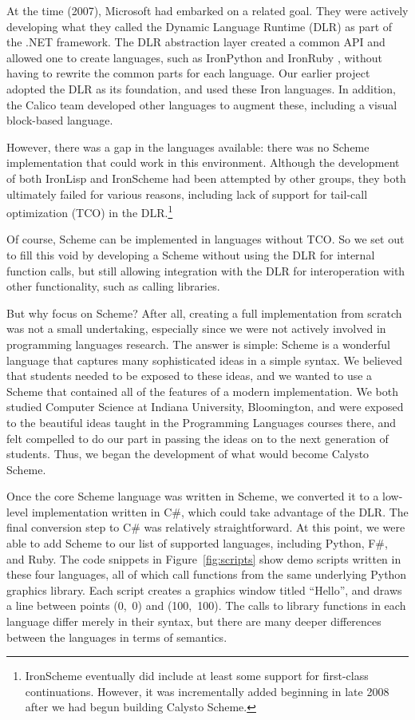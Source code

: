 \documentclass[acmsmall,screen,authorversion]{acmart}
\begin{document}
At the time (2007), Microsoft had embarked on a related goal. They were
actively developing what they called the Dynamic Language Runtime (DLR) as part
of the .NET framework. The DLR abstraction layer created a common API and
allowed one to create languages, such as IronPython and IronRuby
\cite{IronRuby}, without having to rewrite the common parts for each
language. Our earlier project adopted the DLR as its foundation, and used these
Iron languages. In addition, the Calico team developed other languages to
augment these, including a visual block-based language.

However, there was a gap in the languages available: there was no
Scheme implementation that could work in this environment. Although
the development of both IronLisp and IronScheme \cite{IronScheme} had
been attempted by other groups, they both ultimately failed for
various reasons, including lack of support for tail-call optimization
(TCO) in the DLR.\footnote[1]{IronScheme eventually did include at
least some support for first-class continuations. However, it was
incrementally added beginning in late 2008
\cite{IronScheme-Continuations} after we had begun building Calysto
Scheme.}

Of course, Scheme can be implemented in languages without TCO. So we set out to
fill this void by developing a Scheme without using the DLR for internal
function calls, but still allowing integration with the DLR for interoperation
with other functionality, such as calling libraries.

But why focus on Scheme? After all, creating a full implementation from scratch
was not a small undertaking, especially since we were not actively involved in
programming languages research. The answer is simple: Scheme is a wonderful
language that captures many sophisticated ideas in a simple syntax. We believed
that students needed to be exposed to these ideas, and we wanted to use a
Scheme that contained all of the features of a modern implementation. We both
studied Computer Science at Indiana University, Bloomington, and were exposed
to the beautiful ideas taught in the Programming Languages courses there, and
felt compelled to do our part in passing the ideas on to the next generation of
students. Thus, we began the development of what would become Calysto Scheme.

Once the core Scheme language was written in Scheme, we converted it to a
low-level implementation written in C\#, which could take advantage of the
DLR. The final conversion step to C\# was relatively straightforward. At this
point, we were able to add Scheme to our list of supported languages, including
Python, F\#, and Ruby.  The code snippets in Figure~\ref{fig:scripts} show demo
scripts written in these four languages, all of which call functions from the
same underlying Python graphics library. Each script creates a graphics window
titled ``Hello'', and draws a line between points (0,~0) and (100,~100). The
calls to library functions in each language differ merely in their syntax, but
there are many deeper differences between the languages in terms of semantics.
\end{document}
